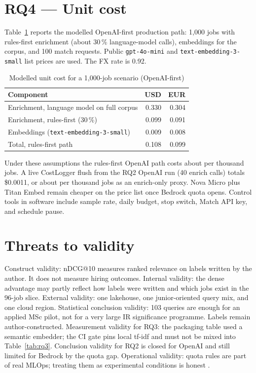 \section{RQ4 --- Unit cost}
\label{sec:rq4}

Table~\ref{tab:roi} reports the modelled OpenAI-first production path: 1{,}000 jobs with rules-first enrichment (about 30\,\% language-model calls), embeddings for the corpus, and 100 match requests. Public \texttt{gpt-4o-mini} and \texttt{text-embedding-3-small} list prices are used. The FX rate is 0.92.

\begin{table}[ht]
\centering
\caption{Modelled unit cost for a 1{,}000-job scenario (OpenAI-first)}
\label{tab:roi}
\begin{tabular}{@{}lrr@{}}
\toprule
\textbf{Component} & \textbf{USD} & \textbf{EUR} \\
\midrule
Enrichment, language model on full corpus & 0.330 & 0.304 \\
Enrichment, rules-first (30\,\%) & 0.099 & 0.091 \\
Embeddings (\texttt{text-embedding-3-small}) & 0.009 & 0.008 \\
Total, rules-first path & 0.108 & 0.099 \\
\bottomrule
\end{tabular}
\end{table}

Under these assumptions the rules-first OpenAI path costs about  per thousand jobs. A live CostLogger flush from the RQ2 OpenAI run (40 enrich calls) totals \$0.0011, or about  per thousand jobs as an enrich-only proxy. Nova Micro plus Titan Embed remain cheaper on the price list once Bedrock quota opens. Control tools in software include sample rate, daily budget, stop switch, Match API key, and schedule pause.

\section{Threats to validity}
\label{sec:threats}

Construct validity: nDCG@10 measures ranked relevance on labels written by the author. It does not measure hiring outcomes. Internal validity: the dense advantage may partly reflect how labels were written and which jobs exist in the 96-job slice. External validity: one lakehouse, one junior-oriented query mix, and one cloud region. Statistical conclusion validity: 103 queries are enough for an applied MSc pilot, not for a very large IR significance programme. Labels remain author-constructed. Measurement validity for RQ3: the packaging table used a semantic embedder; the CI gate pins local tf-idf and must not be mixed into Table~\ref{tab:rq3}. Conclusion validity for RQ2 is closed for OpenAI and still limited for Bedrock by the quota gap. Operational validity: quota rules are part of real MLOps; treating them as experimental conditions is honest .
